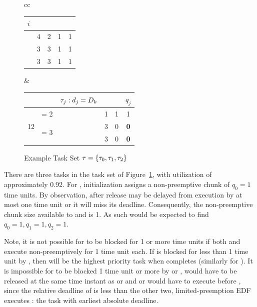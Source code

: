 \documentclass[a4paper,UKenglish,cleveref,autoref,english]{lipics-v2019}
\begin{document}
\begin{figure}[H]
  \begin{tabular}{cc}
    \begin{tabular}{|c|c|c|c|c|}
      \hline
      ${i}$ & \period{i} & \deadline{i} & \taskthreads{i} &
      \wcet{i}{\taskthreads{i}} \\
      \hline
      \task{0} & 4 & 2 & 1 & 1 \\
      \task{1} & 3 & 3 & 1 & 1 \\
      \task{2} & 3 & 3 & 1 & 1 \\
      \hline
    \end{tabular}
    &
    \begin{tabular}{|c||c|c|c|c||c|}
      \hline
      \hp & \Deadline{k} & ${\tau_{j}: d_j = D_k}$ & \dbf{\tasks}{\Deadline{i}}
      & \slack{\Deadline{i}} & ${q_j}$\\
      \hline
      \multirow{3}{*}{12}
      & \Deadline{1} = 2 & \task{0} & 1 & 1 & 1\\
      \cline{2-6}
      & \multirow{2}{*}{\Deadline{2} = 3} & \task{1} & 3 & 0 & \textbf{0}\\
      & & \task{2} & 3 & 0 & \textbf{0}\\      
      \hline
    \end{tabular}
  \end{tabular}
  \caption{Example Task Set ${\tau{} = \{ \tau_{0}, \tau_{1}, \tau_{2} \}}$}
  \label{fig:exbad}
\end{figure}

There are three tasks in the task set of Figure~\ref{fig:exbad}, with 
utilization of approximately 0.92. For , initialization
assigns a non-preemptive chunk of ${q_0 = 1}$ time units. By
observation, after release  may be delayed from execution by
at most one time unit or it will miss its deadline. Consequently, the
non-preemptive chunk size available to  and  is 1. As
such \npchunks{} would be expected to find ${q_0 = 1, q_1 = 1, q_2 =1}$.

Note, it is not possible for  to be blocked for 1
or more time units if both  and  execute
non-preemptively for 1 time unit each. If  is blocked for less
than 1 time unit by , then  will be the highest
priority task when  completes (similarly for ). It is
impossible for  to be blocked 1 time unit or more by 
or ,  would have to be released at the same time
instant as  or  and  or  would have to
execute before , since the relative deadline of  is
less than the other two, limited-preemption EDF executes : the
task with earliest absolute deadline.
\end{document}
